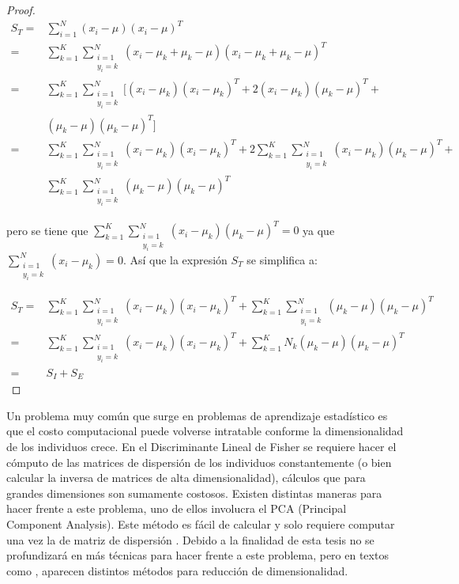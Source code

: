 \begin{proof}
\begin{align*}
S_T =& \sum_{i = 1}^{N} (x_i - \mu)(x_i - \mu)^T \\
    =& \sum_{k = 1}^{K} \sum_{\substack{i=1 \\ y_i = k}}^N  (x_i -\mu_k + \mu_k-\mu)(x_i -\mu_k + \mu_k- \mu)^T \\
    =& \sum_{k = 1}^{K} \sum_{\substack{i=1 \\ y_i = k}}^N  [(x_i -\mu_k)(x_i-\mu_k)^T + 2 (x_i-\mu_k)(\mu_k-\mu)^T +\\
     & (\mu_k -\mu)(\mu_k-\mu)^T ]\\
    =& \sum_{k = 1}^{K} \sum_{\substack{i=1 \\ y_i = k}}^N (x_i -\mu_k)(x_i-\mu_k)^T + 
    2  \sum_{k = 1}^{K} \sum_{\substack{i=1 \\ y_i = k}}^N  (x_i-\mu_k)(\mu_k-\mu)^T  + \\ 
     & \sum_{k = 1}^{K} \sum_{\substack{i=1 \\ y_i = k}}^N  (\mu_k -\mu)(\mu_k-\mu)^T
\end{align*}

pero se tiene que $\sum_{k = 1}^{K} \sum_{\substack{i=1 \\ y_i = k}}^N  (x_i-\mu_k)(\mu_k-\mu)^T = 0$ ya que $\sum_{\substack{i=1 \\ y_i = k}}^N  (x_i-\mu_k) = 0$. Así que la expresión $S_T$ se simplifica a:

\begin{align*}
S_T =& \sum_{k = 1}^{K} \sum_{\substack{i=1 \\ y_i = k}}^N (x_i -\mu_k)(x_i-\mu_k)^T + 
       \sum_{k = 1}^{K} \sum_{\substack{i=1 \\ y_i = k}}^N  (\mu_k -\mu)(\mu_k-\mu)^T \\
      =& \sum_{k = 1}^{K} \sum_{\substack{i=1 \\ y_i = k}}^N (x_i -\mu_k)(x_i-\mu_k)^T +
       \sum_{k = 1}^{K}  N_k  (\mu_k -\mu)(\mu_k-\mu)^T \\
      =& S_I + S_E
\end{align*}
\end{proof}



Un problema muy común que surge en problemas de aprendizaje estadístico es que el costo computacional puede volverse intratable conforme la dimensionalidad de los individuos crece. En el Discriminante Lineal de Fisher se requiere hacer el cómputo de las matrices de dispersión de los individuos constantemente (o bien calcular la inversa de matrices de alta dimensionalidad), cálculos que para grandes dimensiones son sumamente costosos. Existen distintas maneras para hacer frente a este problema, uno de ellos involucra el PCA (Principal Component Analysis). Este método es fácil de calcular y solo requiere computar una vez la de matriz de dispersión \cite{ngo2012trace}. Debido a la finalidad de esta tesis no se profundizará en más técnicas para hacer frente a este problema, pero en textos como \cite{hastie2009elements}, \cite{duda2012pattern} aparecen distintos métodos para reducción de dimensionalidad.


